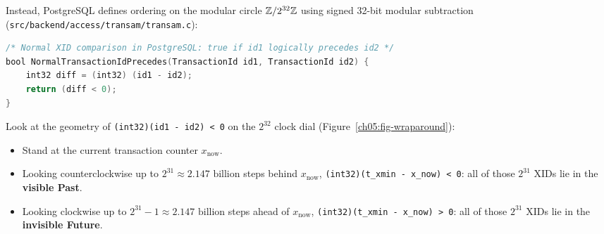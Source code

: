 Instead, PostgreSQL defines ordering on the modular circle $\mathbb{Z} / 2^{32}\mathbb{Z}$ using signed 32-bit modular subtraction (\texttt{src/backend/access/transam/transam.c}):

\begin{lstlisting}[language=C]
/* Normal XID comparison in PostgreSQL: true if id1 logically precedes id2 */
bool NormalTransactionIdPrecedes(TransactionId id1, TransactionId id2) {
    int32 diff = (int32) (id1 - id2);
    return (diff < 0);
}
\end{lstlisting}

Look at the geometry of \texttt{(int32)(id1 - id2) < 0} on the $2^{32}$ clock dial (Figure~\ref{ch05:fig-wraparound}):
\begin{itemize}
  \item Stand at the current transaction counter $x_{\text{now}}$.
  \item Looking counterclockwise up to $2^{31} \approx 2.147\text{ billion}$ steps behind $x_{\text{now}}$, \texttt{(int32)(t\_xmin - x\_now) < 0}: all of those $2^{31}$ XIDs lie in the \textbf{visible Past}.
  \item Looking clockwise up to $2^{31} - 1 \approx 2.147\text{ billion}$ steps ahead of $x_{\text{now}}$, \texttt{(int32)(t\_xmin - x\_now) > 0}: all of those $2^{31}$ XIDs lie in the \textbf{invisible Future}.
\end{itemize}

